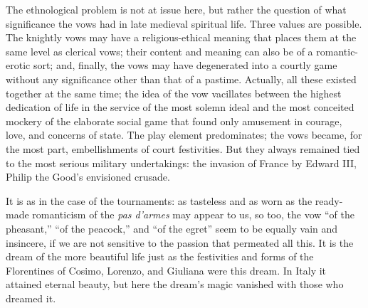 The ethnological problem is not at issue here, but rather the question
of what significance the vows had in late medieval spiritual life. Three
values are possible. The knightly vows may have a religious-ethical
meaning that places them at the same level as clerical vows; their
content and meaning can also be of a romantic-erotic sort; and, finally,
the vows may have degenerated into a courtly game without any
significance other than that of a pastime. Actually, all these existed
together at the same time; the idea of the vow vacillates between the
highest dedication of life in the service of the most solemn ideal and
the most conceited mockery of the elaborate social game that found only
amusement in courage, love, and concerns of state. The play element
predominates; the vows became, for the most part, embellishments of
court festivities. But they always remained tied to the most serious
military undertakings: the invasion of France by Edward III, Philip the
Good's envisioned crusade.

It is as in the case of the tournaments: as tasteless and as worn as the
ready-made romanticism of the \emph{pas d'armes} may appear to us, so
too, the vow ``of the pheasant,'' ``of the peacock,'' and ``of the
egret'' seem to be equally vain and insincere, if we are not sensitive
to the passion that permeated all this. It is the dream of the more
beautiful life just as the festivities and forms of the Florentines of
Cosimo, Lorenzo, and Giuliana were this dream. In Italy it attained
eternal beauty, but here the dream's magic vanished with those who
dreamed it.

